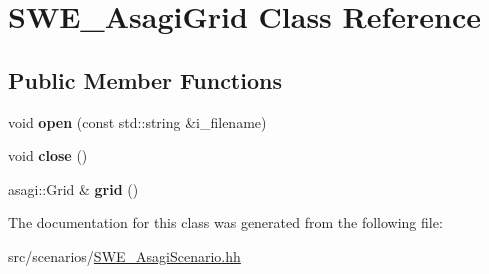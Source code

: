 \hypertarget{classSWE__AsagiGrid}{\section{S\-W\-E\-\_\-\-Asagi\-Grid Class Reference}
\label{classSWE__AsagiGrid}
}
\subsection*{Public Member Functions}
\begin{DoxyCompactItemize}
\item 
\hypertarget{classSWE__AsagiGrid_a36c68a45fd51ed1bae1971ac252ed1cc}{void {\bfseries open} (const std\-::string \&i\-\_\-filename)}\label{classSWE__AsagiGrid_a36c68a45fd51ed1bae1971ac252ed1cc}

\item 
\hypertarget{classSWE__AsagiGrid_ab0dca1af30b0d89f3a68f429c77b0840}{void {\bfseries close} ()}\label{classSWE__AsagiGrid_ab0dca1af30b0d89f3a68f429c77b0840}

\item 
\hypertarget{classSWE__AsagiGrid_a8596fb0fdadd3ab51760d7101d6e89d1}{asagi\-::\-Grid \& {\bfseries grid} ()}\label{classSWE__AsagiGrid_a8596fb0fdadd3ab51760d7101d6e89d1}

\end{DoxyCompactItemize}


The documentation for this class was generated from the following file\-:\begin{DoxyCompactItemize}
\item 
src/scenarios/\hyperlink{SWE__AsagiScenario_8hh}{S\-W\-E\-\_\-\-Asagi\-Scenario.\-hh}\end{DoxyCompactItemize}

